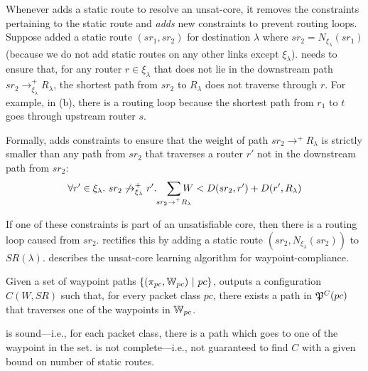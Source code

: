 Whenever \name adds a static route to resolve an unsat-core,
it removes the constraints pertaining to 
the static route and \emph{adds} new constraints to prevent
routing loops. 
Suppose \name added a static route $(sr_1, sr_2)$ for destination
$\lambda$ where $sr_2 = N_{\xi_\lambda}(sr_1)$ (because we do not add
static routes on any other links except $\xi_\lambda$). \name needs to
ensure that, for any router $r\in\xi_\lambda$ that does not 
lie in the downstream path $sr_2 \rightarrow^+_{\xi_\lambda} R_\lambda$, 
the shortest path from $sr_2$ to $R_\lambda$ does not traverse through 
$r$. For example, 
in (b), there is a routing loop because
 the shortest path from $r_1$ to $t$ 
 goes through upstream router $s$.

Formally, \name adds constraints to 
ensure that the weight
of path $sr_2 \rightarrow^+ R_\lambda$ is 
strictly smaller than any path from $sr_2$ that traverses a
router $r'$ not in the downstream path from $sr_2$: 
\begin{equation} \label{eq:rla}
\forall r' \in \xi_\lambda. ~sr_2 \not\rightarrow_{\xi_\lambda}^+ r'. 
\hspace{0.3cm}\sum_{\mathclap{\substack{sr_2 \rightarrow^+ R_\lambda}}} 
W < D(sr_2, r') + D(r', R_\lambda) 
\end{equation}

If one of these constraints is part of an unsatisfiable
core, then there is a routing 
loop caused from $sr_2$. 
\name rectifies this 
by adding a static route 
$(sr_2, N_{\xi_\lambda}(sr_2))$ to $SR(\lambda)$. 
 describes the unsat-core learning algorithm
for waypoint-compliance.

\iffull
\begin{theorem} \label{thm:wayptsr}
	Given a set of waypoint paths \linebreak
	$\{(\pi_{pc}, \mathbb{W}_{pc}) ~|~ pc\}$,
	 outputs a configuration $C(W,SR)$ 
	such that, for every packet class $pc$, 
	there exists a path in $\mathfrak{P}^C(pc)$ that
	traverses one of the waypoints in $\mathbb{W}_{pc}$.
\end{theorem}

\fi

 is sound---i.e., for each packet class, there is a 
path which goes to one of the waypoint in the set. 
 is not complete---i.e., not  
guaranteed to find $C$ with a given bound on number of static routes. 

